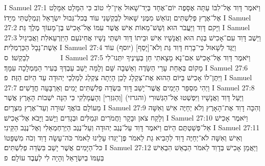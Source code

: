I Samuel 27:1	וַיֹּאמֶר דָּוִד אֶל־לִבּוֹ עַתָּה אֶסָּפֶה יוֹם־אֶחָד בְּיַד־שָׁאוּל אֵין־לִי טוֹב כִּי הִמָּלֵט אִמָּלֵט  אֶל־אֶרֶץ פְּלִשְׁתִּים וְנוֹאַשׁ מִמֶּנִּי שָׁאוּל לְבַקְשֵׁנִי עוֹד בְּכל־גְּבוּל יִשְׂרָאֵל וְנִמְלַטְתִּי מִיָּדוֹ׃
I Samuel 27:2	וַיָּקם דָּוִד וַיַּעֲבֹר הוּא וְשֵׁשׁ־מֵאוֹת אִישׁ אֲשֶׁר עִמּוֹ אֶל־אָכִישׁ בֶּן־מָעוֹךְ מֶלֶךְ גַּת׃
I Samuel 27:3	וַיֵּשֶׁב דָּוִד עִם־אָכִישׁ בְּגַת הוּא וַאֲנָשָׁיו אִישׁ וּבֵיתוֹ דָּוִד וּשְׁתֵּי נָשָׁיו אֲחִינֹעַם הַיִּזְרְעֵאלִת וַאֲבִיגַיִל אֵשֶׁת־נָבָל הַכַּרְמְלִית׃
I Samuel 27:4	וַיֻּגַּד לְשָׁאוּל כִּי־בָרַח דָּוִד גַּת וְלֹא־[יָסַף] (יוסף) עוֹד לְבַקְשׁוֹ׃ {ס}        
I Samuel 27:5	וַיֹּאמֶר דָּוִד אֶל־אָכִישׁ אִם־נָא מָצָאתִי חֵן בְּעֵינֶיךָ יִתְּנוּ־לִי מָקוֹם בְּאַחַת עָרֵי הַשָּׂדֶה וְאֵשְׁבָה שָּׁם וְלָמָּה יֵשֵׁב עַבְדְּךָ בְּעִיר הַמַּמְלָכָה עִמָּךְ׃
I Samuel 27:6	וַיִּתֶּן־לוֹ אָכִישׁ בַּיּוֹם הַהוּא אֶת־צִקְלָג לָכֵן הָיְתָה צִקְלַג לְמַלְכֵי יְהוּדָה עַד הַיּוֹם הַזֶּה׃ {פ}
I Samuel 27:7	וַיְהִי מִסְפַּר הַיָּמִים אֲשֶׁר־יָשַׁב דָּוִד בִּשְׂדֵה פְלִשְׁתִּים יָמִים וְאַרְבָּעָה חֳדָשִׁים׃
I Samuel 27:8	וַיַּעַל דָּוִד וַאֲנָשָׁיו וַיִּפְשְׁטוּ אֶל־הַגְּשׁוּרִי (והגרזי) [וְהַגִּזְרִי] וְהָעֲמָלֵקִי כִּי הֵנָּה יֹשְׁבוֹת הָאָרֶץ אֲשֶׁר מֵעוֹלָם בּוֹאֲךָ שׁוּרָה וְעַד־אֶרֶץ מִצְרָיִם׃
I Samuel 27:9	וְהִכָּה דָוִד אֶת־הָאָרֶץ וְלֹא יְחַיֶּה אִישׁ וְאִשָּׁה וְלָקַח צֹאן וּבָקָר וַחֲמֹרִים וּגְמַלִּים וּבְגָדִים וַיָּשׁב וַיָּבֹא אֶל־אָכִישׁ׃
I Samuel 27:10	וַיֹּאמֶר אָכִישׁ אַל־פְּשַׁטְתֶּם הַיּוֹם וַיֹּאמֶר דָּוִד עַל־נֶגֶב יְהוּדָה וְעַל־נֶגֶב הַיְּרַחְמְאֵלִי וְאֶל־נֶגֶב הַקֵּינִי׃
I Samuel 27:11	וְאִישׁ וְאִשָּׁה לֹא־יְחַיֶּה דָוִד לְהָבִיא גַת לֵאמֹר פֶּן־יַגִּדוּ עָלֵינוּ לֵאמֹר כֹּה־עָשָׂה דָוִד וְכֹה מִשְׁפָּטוֹ כּל־הַיָּמִים אֲשֶׁר יָשַׁב בִּשְׂדֵה פְלִשְׁתִּים׃
I Samuel 27:12	וַיַּאֲמֵן אָכִישׁ בְּדָוִד לֵאמֹר הַבְאֵשׁ הִבְאִישׁ בְּעַמּוֹ בְיִשְׂרָאֵל וְהָיָה לִי לְעֶבֶד עוֹלָם׃ {פ}
